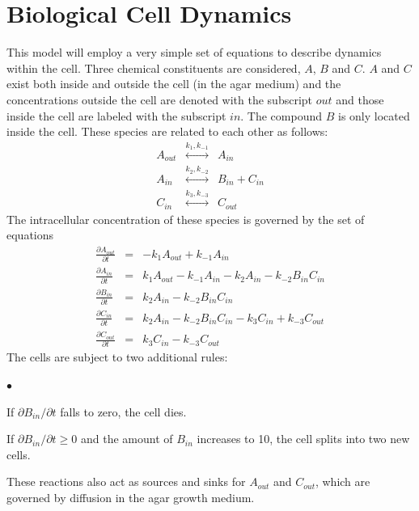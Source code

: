 \documentclass[12pt]{article}
\begin{document}
\section{Biological Cell Dynamics}
This model will employ a very simple set of equations to describe dynamics within the
cell. Three chemical constituents are considered, $A$, $B$ and $C$. $A$ and $C$ exist
both inside and outside the cell (in the agar medium) and the concentrations outside
the cell are denoted with the subscript $out$ and those inside the cell are labeled
with the subscript $in$. The compound $B$ is only located inside the cell. These species
are related to each other as follows:
\begin{eqnarray*}
A_{out} &\stackrel{k_{1},k_{-1}}{\longleftrightarrow}& A_{in} \\
A_{in} &\stackrel{k_2,k_{-2}}{\longleftrightarrow}& B_{in} + C_{in} \\
C_{in} &\stackrel{k_3,k_{-3}}{\longleftrightarrow}& C_{out}
\end{eqnarray*}
The intracellular concentration of these species is governed by the set of equations
\begin{eqnarray*}
\frac{\partial A_{out}}{\partial t} &=&-k_1 A_{out}+k_{-1} A_{in} \\
\frac{\partial A_{in}}{\partial t} &=&k_1 A_{out}-k_{-1} A_{in} - k_2 A_{in}
 - k_{-2}B_{in}C_{in}\\
\frac{\partial B_{in}}{\partial t} &=&k_2 A_{in} - k_{-2}B_{in}C_{in}\\
\frac{\partial C_{in}}{\partial t} &=&k_2 A_{in} - k_{-2}B_{in}C_{in}-k_3 C_{in}
+ k_{-3} C_{out} \\
\frac{\partial C_{out}}{\partial t} &=&k_3 C_{in}-k_{-3} C_{out}
\end{eqnarray*}
The cells are subject to two additional rules:
\begin{list}{$\bullet$}{}
\item If $\partial B_{in}/\partial t$ falls to zero, the cell dies.
\item If $\partial B_{in}/\partial t \ge 0$ and the amount of $B_{in}$ increases to 10, the
cell splits into two new cells.
\end{list}
These reactions also act as sources and sinks for $A_{out}$ and $C_{out}$, which are governed
by diffusion in the agar growth medium.
\end{document}
